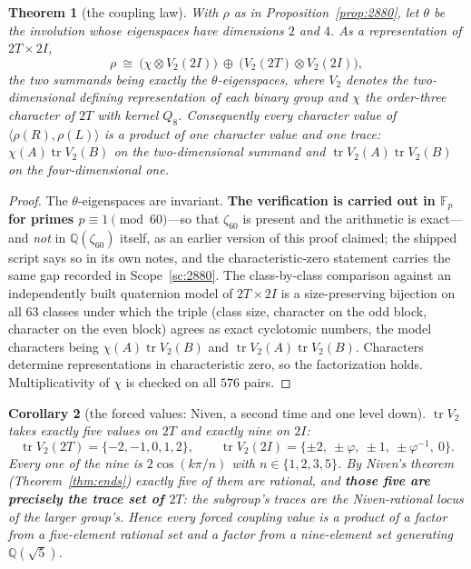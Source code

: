 \documentclass[11pt,reqno]{amsart}
\theoremstyle{plain}
\newtheorem{theorem}{Theorem}[section]
\newtheorem{corollary}[theorem]{Corollary}
\theoremstyle{definition}
\theoremstyle{remark}
\newcommand{\Q}{\mathbb{Q}}
\newcommand{\F}{\mathbb{F}}
\begin{document}
\begin{theorem}[the coupling law]\label{thm:coupling}
With $\rho$ as in Proposition~\ref{prop:2880}, let $\theta$ be the involution whose
eigenspaces have dimensions $2$ and $4$. As a representation of $2T\times2I$,
\[
  \rho\ \cong\ \bigl(\chi\otimes V_2(2I)\bigr)\ \oplus\
              \bigl(V_2(2T)\otimes V_2(2I)\bigr),
\]
the two summands being \emph{exactly} the $\theta$-eigenspaces, where $V_2$ denotes the
two-dimensional defining representation of each binary group and $\chi$ the order-three
character of $2T$ with kernel $Q_8$. Consequently every character value of
$\langle\rho(R),\rho(L)\rangle$ is a product of one character value and one trace:
$\chi(A)\operatorname{tr}V_2(B)$ on the two-dimensional summand and
$\operatorname{tr}V_2(A)\operatorname{tr}V_2(B)$ on the four-dimensional one.
\end{theorem}

\begin{proof}
The $\theta$-eigenspaces are invariant. \textbf{The verification is carried out in
$\F_p$ for primes $p\equiv1\pmod{60}$}---so that $\zeta_{60}$ is present and the
arithmetic is exact---and \emph{not} in $\Q(\zeta_{60})$ itself, as an earlier version of
this proof claimed; the shipped script says so in its own notes, and the characteristic-zero
statement carries the same gap recorded in Scope~\ref{sc:2880}. The
class-by-class comparison against an independently built quaternion model of
$2T\times2I$ is a size-preserving bijection on all $63$ classes under which the triple
(class size, character on the odd block, character on the even block) agrees as exact
cyclotomic numbers, the model characters being $\chi(A)\operatorname{tr}V_2(B)$ and
$\operatorname{tr}V_2(A)\operatorname{tr}V_2(B)$. Characters determine representations in
characteristic zero, so the factorization holds. Multiplicativity of $\chi$ is checked on
all $576$ pairs.
\end{proof}

\begin{corollary}[the forced values: Niven, a second time and one level down]%
\label{cor:ninecos}
$\operatorname{tr}V_2$ takes exactly five values on $2T$ and exactly nine on $2I$:
\[
  \operatorname{tr}V_2(2T)=\{-2,-1,0,1,2\},\qquad
  \operatorname{tr}V_2(2I)=\{\pm2,\ \pm\varphi,\ \pm1,\ \pm\varphi^{-1},\ 0\}.
\]
Every one of the nine is
$2\cos(k\pi/n)$ with $n\in\{1,2,3,5\}$. By Niven's theorem (Theorem~\ref{thm:ends})
exactly five of them are rational, and \textbf{those five are precisely the trace set of
$2T$}: the subgroup's traces are the Niven-rational locus of the larger group's. Hence
every forced coupling value is a product of a factor from a five-element rational set and
a factor from a nine-element set generating $\Q(\sqrt5)$.
\end{corollary}
\end{document}
